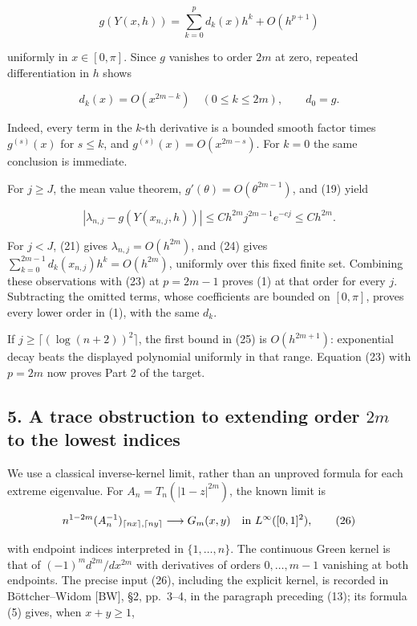 \documentclass[10pt,a4paper]{article}
\begin{document}
\nopagebreak[3]
\[
g(Y(x,h))=\sum_{k=0}^p d_k(x)h^k+O(h^{p+1})
\tag{23}
\]

uniformly in \(x\in[0,\pi]\). Since \(g\) vanishes to order \(2m\) at zero, repeated differentiation in \(h\) shows

\nopagebreak[3]
\[
d_k(x)=O(x^{2m-k})\quad(0\le k\le2m),\qquad d_0=g.
\tag{24}
\]

Indeed, every term in the \(k\)-th derivative is a bounded smooth factor times \(g^{(s)}(x)\) for \(s\le k\), and \(g^{(s)}(x)=O(x^{2m-s})\). For \(k=0\) the same conclusion is immediate.

For \(j\ge J\), the mean value theorem, \(g'(\theta)=O(\theta^{2m-1})\), and (19) yield

\nopagebreak[3]
\[
|\lambda_{n,j}-g(Y(x_{n,j},h))|
\le C h^{2m}j^{2m-1}e^{-cj}\le C h^{2m}.
\tag{25}
\]

For \(j<J\), (21) gives \(\lambda_{n,j}=O(h^{2m})\), and (24) gives \(\sum_{k=0}^{2m-1}d_k(x_{n,j})h^k=O(h^{2m})\), uniformly over this fixed finite set. Combining these observations with (23) at \(p=2m-1\) proves (1) at that order for every \(j\). Subtracting the omitted terms, whose coefficients are bounded on \([0,\pi]\), proves every lower order in (1), with the same \(d_k\).

If \(j\ge\lceil(\log(n+2))^2\rceil\), the first bound in (25) is \(O(h^{2m+1})\): exponential decay beats the displayed polynomial uniformly in that range. Equation (23) with \(p=2m\) now proves Part 2 of the target.

\subsection{\texorpdfstring{5. A trace obstruction to extending order \(2m\) to the lowest indices}{5. A trace obstruction to extending order 2m to the lowest indices}}\label{a-trace-obstruction-to-extending-order-2m-to-the-lowest-indices}

We use a classical inverse-kernel limit, rather than an unproved formula for each extreme eigenvalue. For \(A_n=T_n(|1-z|^{2m})\), the known limit is

\nopagebreak[3]
\[
n^{1-2m}(A_n^{-1})_{\lceil nx\rceil,\lceil ny\rceil}\longrightarrow G_m(x,y)
\quad\hbox{in }L^\infty([0,1]^2),
\tag{26}
\]

with endpoint indices interpreted in \(\{1,\ldots,n\}\). The continuous Green kernel is that of \((-1)^m d^{2m}/dx^{2m}\) with derivatives of orders \(0,\ldots,m-1\) vanishing at both endpoints. The precise input (26), including the explicit kernel, is recorded in Böttcher--Widom {[}BW{]}, §2, pp.~3--4, in the paragraph preceding (13); its formula (5) gives, when \(x+y\ge1\),
\end{document}
